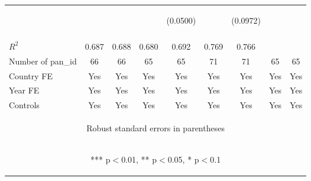 \documentclass[]{article}
\begin{document}
\begin{center}
\begin{tabular}{lcccccccc}
 & \begin{footnotesize}\end{footnotesize} & \begin{footnotesize}\end{footnotesize} & \begin{footnotesize}\end{footnotesize} & \begin{footnotesize}(0.0500)\end{footnotesize} & \begin{footnotesize}\end{footnotesize} & \begin{footnotesize}(0.0972)\end{footnotesize} & \begin{footnotesize}\end{footnotesize} & \begin{footnotesize}\end{footnotesize} \\
\vspace{4pt} & \begin{footnotesize}\end{footnotesize} & \begin{footnotesize}\end{footnotesize} & \begin{footnotesize}\end{footnotesize} & \begin{footnotesize}\end{footnotesize} & \begin{footnotesize}\end{footnotesize} & \begin{footnotesize}\end{footnotesize} & \begin{footnotesize}\end{footnotesize} & \begin{footnotesize}\end{footnotesize} \\
$R^2$ & 0.687 & 0.688 & 0.680 & 0.692 & 0.769 & 0.766 &  &  \\
Number of pan\_id & 66 & 66 & 65 & 65 & 71 & 71 & 65 & 65 \\
Country FE & Yes & Yes & Yes & Yes & Yes & Yes & Yes & Yes \\
Year FE & Yes & Yes & Yes & Yes & Yes & Yes & Yes & Yes \\
 Controls & Yes & Yes & Yes & Yes & Yes & Yes & Yes & Yes \\ \hline
\multicolumn{9}{c}{\begin{footnotesize} Robust standard errors in parentheses\end{footnotesize}} \\
\multicolumn{9}{c}{\begin{footnotesize} *** p$<$0.01, ** p$<$0.05, * p$<$0.1\end{footnotesize}} \\
\end{tabular}
\end{center}
\end{document}

